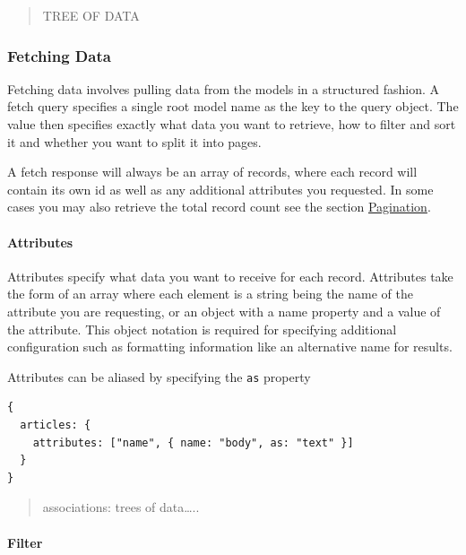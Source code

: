 \documentclass[
  12pt,
]{article}
\newcommand{\passthrough}[1]{#1}
\let\oldparagraph\paragraph
\renewcommand{\paragraph}[1]{\oldparagraph{#1}\mbox{}}
\begin{document}
\begin{quote}
TREE OF DATA
\end{quote}

\hypertarget{fetching-data}{%
\subsubsection{Fetching Data}\label{fetching-data}}

Fetching data involves pulling data from the models in a structured
fashion. A fetch query specifies a single root model name as the key to
the query object. The value then specifies exactly what data you want to
retrieve, how to filter and sort it and whether you want to split it
into pages.

A fetch response will always be an array of records, where each record
will contain its own id as well as any additional attributes you
requested. In some cases you may also retrieve the total record count
see the section \protect\hyperlink{pagination}{Pagination}.

\hypertarget{attributes-1}{%
\paragraph{Attributes}\label{attributes-1}}

Attributes specify what data you want to receive for each record.
Attributes take the form of an array where each element is a string
being the name of the attribute you are requesting, or an object with a
name property and a value of the attribute. This object notation is
required for specifying additional configuration such as formatting
information like an alternative name for results.

Attributes can be aliased by specifying the \passthrough{\lstinline!as!}
property

\begin{lstlisting}[caption={This query will return all articles each containing the article’s id, name, and body. The body will be aliased under the name "text"}]
{
  articles: {
    attributes: ["name", { name: "body", as: "text" }]
  }
}
\end{lstlisting}

\begin{quote}
associations: trees of data\ldots..
\end{quote}

\hypertarget{filter}{%
\paragraph{Filter}\label{filter}}
\end{document}

